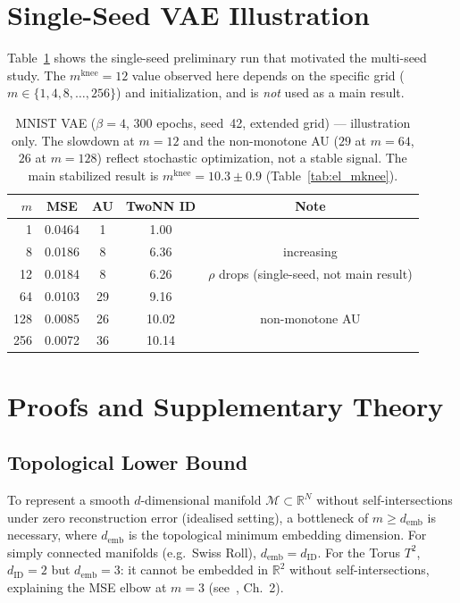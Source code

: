 \documentclass[make,article,submit,pdftex,moreauthors]{Definitions/mdpi}
\newcommand{\dID}{d_{\mathrm{ID}}}
\newcommand{\R}{\mathbb{R}}
\newcommand{\mknee}{m^{\mathrm{knee}}}
\newcommand{\demb}{d_{\mathrm{emb}}}
\begin{document}
\appendix

\section{Single-Seed VAE Illustration}\label{app:vae_single_seed}

Table~\ref{tab:e4_vae} shows the single-seed preliminary run that motivated
the multi-seed study.
The $\mknee=12$ value observed here depends on the specific grid
($m\in\{1,4,8,\ldots,256\}$) and initialization, and is \emph{not} used as a
main result.

\begin{table}[H]
\centering
\caption{MNIST VAE ($\beta=4$, 300 epochs, seed~42, extended grid) — illustration only.
The slowdown at $m=12$ and the non-monotone AU ($29$ at $m=64$, $26$ at $m=128$)
reflect stochastic optimization, not a stable signal.
The main stabilized result is $\mknee=10.3\pm0.9$ (Table~\ref{tab:el_mknee}).}
\label{tab:e4_vae}
\small
\begin{tabular}{rcccc}
\toprule
$m$ & MSE & AU & TwoNN ID & Note \\
\midrule
1   & 0.0464 & 1  & 1.00  & \\
8   & 0.0186 & 8  & 6.36  & increasing \\
12  & 0.0184 & 8  & 6.26  & $\rho$ drops (single-seed, not main result) \\
64  & 0.0103 & 29 & 9.16  & \\
128 & 0.0085 & 26 & 10.02 & non-monotone AU \\
256 & 0.0072 & 36 & 10.14 & \\
\bottomrule
\end{tabular}
\end{table}

\section{Proofs and Supplementary Theory}\label{app:proofs}

\subsection{Topological Lower Bound}\label{app:lower_bound}

\begin{proposition}
To represent a smooth $d$-dimensional manifold $\mathcal{M}\subset\R^N$
without self-intersections under zero reconstruction error (idealised setting),
a bottleneck of $m\geq\demb$ is necessary, where $\demb$ is the topological
minimum embedding dimension.
For simply connected manifolds (e.g.\ Swiss Roll), $\demb=\dID$.
For the Torus $T^2$, $\dID=2$ but $\demb=3$: it cannot be embedded in $\R^2$
without self-intersections, explaining the MSE elbow at $m=3$
(see~\cite{hatcher2002algebraic}, Ch.~2).
\end{proposition}
\end{document}
